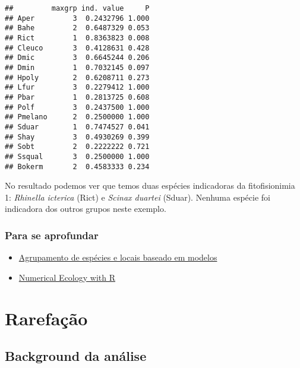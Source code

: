 \documentclass[
]{book}
\providecommand{\tightlist}{%
  \setlength{\itemsep}{0pt}\setlength{\parskip}{0pt}}
\begin{document}
\begin{verbatim}
##         maxgrp ind. value     P
## Aper         3  0.2432796 1.000
## Bahe         2  0.6487329 0.053
## Rict         1  0.8363823 0.008
## Cleuco       3  0.4128631 0.428
## Dmic         3  0.6645244 0.206
## Dmin         1  0.7032145 0.097
## Hpoly        2  0.6208711 0.273
## Lfur         3  0.2279412 1.000
## Pbar         1  0.2813725 0.608
## Polf         3  0.2437500 1.000
## Pmelano      2  0.2500000 1.000
## Sduar        1  0.7474527 0.041
## Shay         3  0.4930269 0.399
## Sobt         2  0.2222222 0.721
## Ssqual       3  0.2500000 1.000
## Bokerm       2  0.4583333 0.234
\end{verbatim}

No resultado podemos ver que temos duas espécies indicadoras da fitofisionimia 1: \emph{Rhinella icterica} (Rict) e \emph{Scinax duartei} (Sduar). Nenhuma espécie foi indicadora dos outros grupos neste exemplo.

\hypertarget{para-se-aprofundar}{%
\subsection{Para se aprofundar}\label{para-se-aprofundar}}

\begin{itemize}
\tightlist
\item
  \href{https://www.sciencedirect.com/science/article/pii/S0304380010006393?casa_token=0YLFbVbGj1IAAAAA:RFcrLHBDdt-NY5gpxCEAqlc8LMG0ayzChpMvaOFQkE10ftg2Us6PafgMQCSmCZZ21eb430e_lWo}{Agrupamento de espécies e locais baseado em modelos}
\item
  \href{http://adn.biol.umontreal.ca/~numericalecology/numecolR/}{Numerical Ecology with R}
\end{itemize}

\hypertarget{rarefauxe7uxe3o}{%
\chapter{Rarefação}\label{rarefauxe7uxe3o}}

\hypertarget{background-da-anuxe1lise}{%
\section{Background da análise}\label{background-da-anuxe1lise}}
\end{document}
